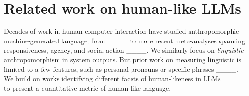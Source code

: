 \section{Related work on human-like LLMs}
Decades of work in human-computer interaction have studied anthropomorphic machine-generated language, from ____ to more recent meta-analyses spanning responsiveness, agency, and social action ____. We similarly focus on \textit{linguistic} anthropomorphism in system outputs.
But prior work on measuring linguistic \ant is limited to a few features, such as personal pronouns or specific phrases ____.
We build on works identifying different facets of human-likeness in LLMs ____ to present a quantitative metric of human-like language.